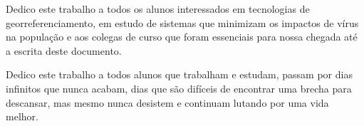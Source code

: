 Dedico este trabalho a todos os alunos interessados em tecnologias de georreferenciamento, em estudo de sistemas que minimizam os impactos de vírus na população e aos colegas de curso que foram essenciais para nossa chegada até a escrita deste documento.

Dedico este trabalho a todos alunos que trabalham e estudam, passam por dias infinitos que nunca acabam, dias que são difíceis de encontrar uma brecha para descansar, mas mesmo nunca desistem e continuam lutando por uma vida melhor. 